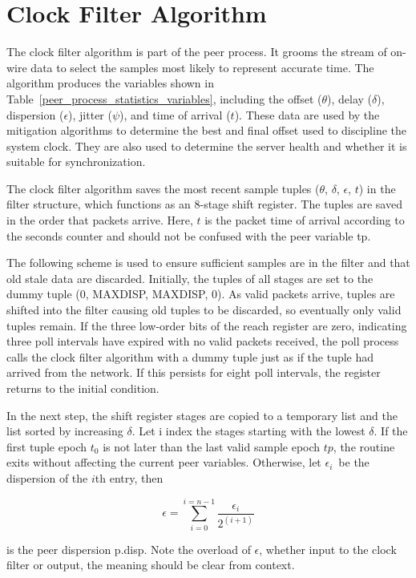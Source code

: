 \chapter{Clock Filter Algorithm}
\label{section-10}

The clock filter algorithm is part of the peer process. It grooms
the stream of on-wire data to select the samples most likely to
represent accurate time. The algorithm produces the variables shown
in Table~\ref{peer_process_statistics_variables}, including the offset ($ \theta $), delay ($ \delta $), dispersion
($ \epsilon $), jitter ($ \psi $), and time of arrival ($ t $). These data are
used by the mitigation algorithms to determine the best and final
offset used to discipline the system clock. They are also used to
determine the server health and whether it is suitable for
synchronization.

The clock filter algorithm saves the most recent sample tuples
($ \theta $, $ \delta $, $ \epsilon $, $ t $) in the filter structure, which functions
as an 8-stage shift register. The tuples are saved in the order that
packets arrive. Here, $ t $ is the packet time of arrival according to
the seconds counter and should not be confused with the peer variable
tp.

The following scheme is used to ensure sufficient samples are in the
filter and that old stale data are discarded. Initially, the tuples
of all stages are set to the dummy tuple (0, MAXDISP, MAXDISP, 0).
As valid packets arrive, tuples are shifted into the filter causing
old tuples to be discarded, so eventually only valid tuples remain.
If the three low-order bits of the reach register are zero,
indicating three poll intervals have expired with no valid packets
received, the poll process calls the clock filter algorithm with a
dummy tuple just as if the tuple had arrived from the network. If
this persists for eight poll intervals, the register returns to the
initial condition.

In the next step, the shift register stages are copied to a temporary
list and the list sorted by increasing $ \delta $. Let i index the stages
starting with the lowest $ \delta $. If the first tuple epoch $t_0 $ is not
later than the last valid sample epoch $ tp $, the routine exits without
affecting the current peer variables. Otherwise, let $ \epsilon_i $\ be
the dispersion of the $ i $th entry, then

$$
\epsilon = \sum^{i = n - 1}_{i = 0} \frac{\epsilon_i}{2^{(i + 1)}}
$$

is the peer dispersion p.disp. Note the overload of $ \epsilon $, whether
input to the clock filter or output, the meaning should be clear from
context.

